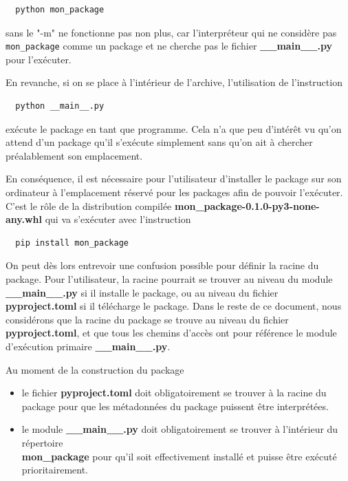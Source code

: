 \documentclass[twoside,a4paper,11pt,frenchb,openany]{report}
\begin{document}
\begin{itemize}
\begin{verbatim}
  python mon_package
\end{verbatim}

sans le "-m" ne fonctionne pas non plus, car l'interpréteur qui ne considère pas \texttt{mon\_package} comme un package et ne cherche pas le fichier \textbf{\_\_main\_\_.py} pour l'exécuter.

En revanche, si on se place à l'intérieur de l'archive, l'utilisation de l'instruction

\begin{verbatim}
  python __main__.py
\end{verbatim}

exécute le package en tant que programme. Cela n'a que peu d'intérêt vu qu'on attend d'un package qu'il s'exécute simplement sans qu'on ait à chercher préalablement son emplacement.

\end{itemize}

En conséquence, il est nécessaire pour l'utilisateur d'installer le package sur son ordinateur à l'emplacement réservé pour les packages afin de pouvoir l'exécuter. C'est le rôle de la distribution compilée \textbf{mon\_package-0.1.0-py3-none-any.whl} qui va s'exécuter avec l'instruction

\begin{verbatim}
  pip install mon_package
\end{verbatim}  

On peut dès lors entrevoir une confusion possible pour définir la racine du package. Pour l'utilisateur, la racine pourrait se trouver au niveau du module \textbf{\_\_main\_\_.py} si il installe le package, ou au niveau du fichier \textbf{pyproject.toml} si il télécharge le package. Dans le reste de ce document, nous considérons que la racine du package se trouve au niveau du fichier \textbf{pyproject.toml}, et que tous les chemins d'accès ont pour référence le module d'exécution primaire \textbf{\_\_main\_\_.py}.

Au moment de la construction du package
\begin{itemize}
\item le fichier \textbf{pyproject.toml} doit obligatoirement se trouver à la racine du package pour que les métadonnées du package puissent être interprétées.
\item le module \textbf{\_\_main\_\_.py} doit obligatoirement se trouver à l'intérieur du répertoire \\\textbf{mon\_package} pour qu'il soit effectivement installé et puisse être exécuté prioritairement.
\end{itemize}
\end{document}
